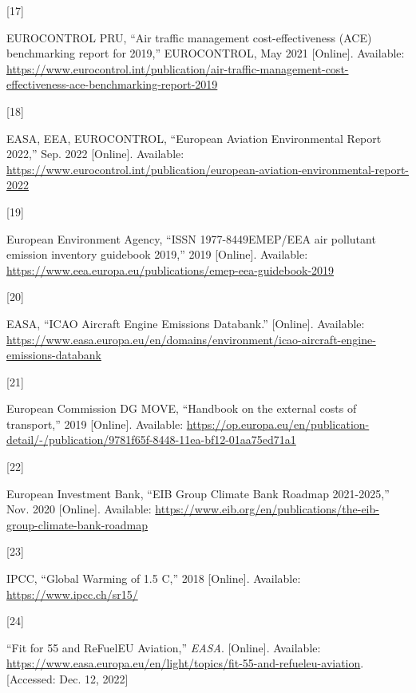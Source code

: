 \documentclass[
  11pt,
  a4paper,
]{book}
\newlength{\cslhangindent}
\newlength{\csllabelwidth}
\newlength{\cslentryspacingunit} %
\newenvironment{CSLReferences}[2] %
 {%
  \setlength{\parindent}{0pt}
  \ifodd #1
  \let\oldpar\par
  \def\par{\hangindent=\cslhangindent\oldpar}
  \fi
  \setlength{\parskip}{#2\cslentryspacingunit}
 }%
 {}
\newcommand{\CSLLeftMargin}[1]{\parbox[t]{\csllabelwidth}{#1}}
\newcommand{\CSLRightInline}[1]{\parbox[t]{\linewidth - \csllabelwidth}{#1}\break}
\begin{document}
\begin{CSLReferences}{0}{0}
\leavevmode{}%
\CSLLeftMargin{{[}17{]} }%
\CSLRightInline{EUROCONTROL PRU, {``Air traffic management
cost-effectiveness ({ACE}) benchmarking report for 2019,''}
{EUROCONTROL}, May 2021 {[}Online{]}. Available:
\url{https://www.eurocontrol.int/publication/air-traffic-management-cost-effectiveness-ace-benchmarking-report-2019}}

\leavevmode{}%
\CSLLeftMargin{{[}18{]} }%
\CSLRightInline{EASA, EEA, EUROCONTROL, {``European {Aviation
Environmental Report} 2022,''} Sep. 2022 {[}Online{]}. Available:
\url{https://www.eurocontrol.int/publication/european-aviation-environmental-report-2022}}

\leavevmode{}%
\CSLLeftMargin{{[}19{]} }%
\CSLRightInline{European Environment Agency, {``{ISSN}
1977-{8449EMEP}/{EEA} air pollutant emission inventory guidebook
2019,''} 2019 {[}Online{]}. Available:
\url{https://www.eea.europa.eu/publications/emep-eea-guidebook-2019}}

\leavevmode{}%
\CSLLeftMargin{{[}20{]} }%
\CSLRightInline{EASA, {``{ICAO Aircraft Engine Emissions Databank}.''}
{[}Online{]}. Available:
\url{https://www.easa.europa.eu/en/domains/environment/icao-aircraft-engine-emissions-databank}}

\leavevmode{}%
\CSLLeftMargin{{[}21{]} }%
\CSLRightInline{European Commission DG MOVE, {``Handbook on the external
costs of transport,''} 2019 {[}Online{]}. Available:
\url{https://op.europa.eu/en/publication-detail/-/publication/9781f65f-8448-11ea-bf12-01aa75ed71a1}}

\leavevmode{}%
\CSLLeftMargin{{[}22{]} }%
\CSLRightInline{European Investment Bank, {``{EIB Group Climate Bank
Roadmap} 2021-2025,''} Nov. 2020 {[}Online{]}. Available:
\url{https://www.eib.org/en/publications/the-eib-group-climate-bank-roadmap}}

\leavevmode{}%
\CSLLeftMargin{{[}23{]} }%
\CSLRightInline{IPCC, {``Global {Warming} of 1.5
{\textordmasculine C},''} 2018 {[}Online{]}. Available:
\url{https://www.ipcc.ch/sr15/}}

\leavevmode{}%
\CSLLeftMargin{{[}24{]} }%
\CSLRightInline{{``Fit for 55 and {ReFuelEU Aviation},''} \emph{EASA}.
{[}Online{]}. Available:
\url{https://www.easa.europa.eu/en/light/topics/fit-55-and-refueleu-aviation}.
{[}Accessed: Dec. 12, 2022{]}}


\end{CSLReferences}
\end{document}

